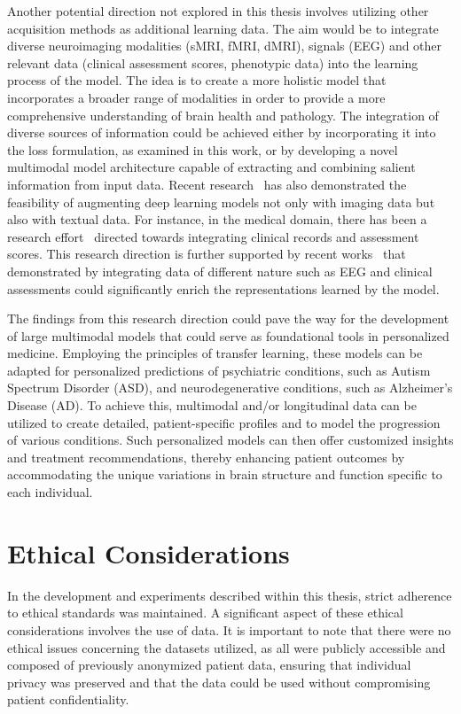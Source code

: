 Another potential direction not explored in this thesis involves utilizing other
acquisition methods as additional learning data. The aim would be to integrate
diverse neuroimaging modalities (sMRI, fMRI, dMRI), signals (EEG) and other
relevant data (clinical assessment scores, phenotypic data) into the learning
process of the model. The idea is to create a more holistic model that
incorporates a broader range of modalities in order to provide a more
comprehensive understanding of brain health and pathology. The integration of
diverse sources of information could be achieved either by incorporating it into
the loss formulation, as examined in this work, or by developing a novel
multimodal model architecture capable of extracting and combining salient
information from input data.
Recent research~ has also demonstrated the
feasibility of augmenting deep learning models not only with imaging data but
also with textual data. For instance, in the medical domain, there has been a
research effort~ directed towards integrating
clinical records and assessment scores. This research direction is further
supported by recent works~ that
demonstrated by integrating data of different nature such as EEG and clinical
assessments could significantly enrich the representations learned by the model.

The findings from this research direction could pave the way for the development
of large multimodal models that could serve as foundational tools in
personalized medicine. Employing the principles of transfer learning, these
models can be adapted for personalized predictions of psychiatric conditions,
such as Autism Spectrum Disorder (ASD), and neurodegenerative conditions, such
as Alzheimer's Disease (AD). To achieve this, multimodal and/or longitudinal
data can be utilized to create detailed, patient-specific profiles and to model
the progression of various conditions. Such personalized models can then offer
customized insights and treatment recommendations, thereby enhancing patient
outcomes by accommodating the unique variations in brain structure and function
specific to each individual.

\section*{Ethical Considerations}
In the development and experiments described within this thesis, strict
adherence to ethical standards was maintained. A significant aspect of these
ethical considerations involves the use of data. It is important to note that
there were no ethical issues concerning the datasets utilized, as all were
publicly accessible and composed of previously anonymized patient data, ensuring
that individual privacy was preserved and that the data could be used without
compromising patient confidentiality.

